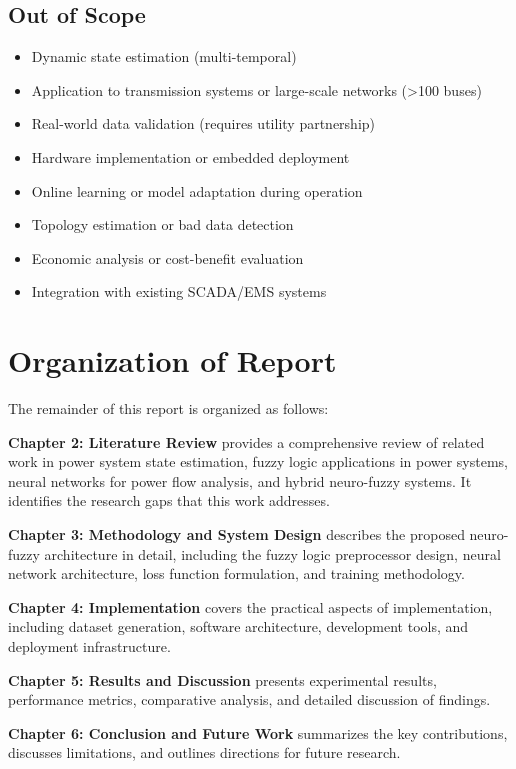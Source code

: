 \documentclass[12pt,a4paper]{report}
\begin{document}
\subsection{Out of Scope}

\begin{itemize}
    \item Dynamic state estimation (multi-temporal)
    \item Application to transmission systems or large-scale networks (>100 buses)
    \item Real-world data validation (requires utility partnership)
    \item Hardware implementation or embedded deployment
    \item Online learning or model adaptation during operation
    \item Topology estimation or bad data detection
    \item Economic analysis or cost-benefit evaluation
    \item Integration with existing SCADA/EMS systems
\end{itemize}

\section{Organization of Report}

The remainder of this report is organized as follows:

\textbf{Chapter 2: Literature Review} provides a comprehensive review of related work in power system state estimation, fuzzy logic applications in power systems, neural networks for power flow analysis, and hybrid neuro-fuzzy systems. It identifies the research gaps that this work addresses.

\textbf{Chapter 3: Methodology and System Design} describes the proposed neuro-fuzzy architecture in detail, including the fuzzy logic preprocessor design, neural network architecture, loss function formulation, and training methodology.

\textbf{Chapter 4: Implementation} covers the practical aspects of implementation, including dataset generation, software architecture, development tools, and deployment infrastructure.

\textbf{Chapter 5: Results and Discussion} presents experimental results, performance metrics, comparative analysis, and detailed discussion of findings.

\textbf{Chapter 6: Conclusion and Future Work} summarizes the key contributions, discusses limitations, and outlines directions for future research.
\end{document}
